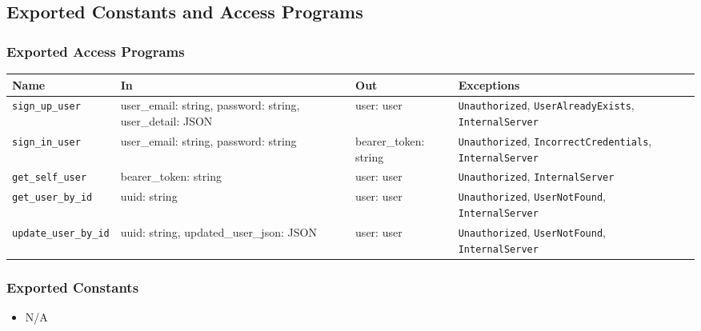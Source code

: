 \documentclass[12pt, titlepage]{article}
\begin{document}
\subsection{Exported Constants and Access Programs}
\subsubsection{Exported Access Programs}
\begin{center}
\small
\renewcommand{\arraystretch}{1.5}
\begin{tabular}{|p{3.5cm}|p{3.5cm}|p{2.5cm}|p{4cm}|}
    \hline
    \textbf{Name} & \textbf{In} & \textbf{Out} & \textbf{Exceptions} \\
    \hline 
    \texttt{sign\_up\_user} & user\_email: string, \newline password: string, \newline user\_detail: JSON & user: user & \texttt{Unauthorized}, \newline \texttt{UserAlreadyExists}, \newline \texttt{InternalServer} \\
    \hline
    \texttt{sign\_in\_user} & user\_email: string, \newline password: string & bearer\_token: string & \texttt{Unauthorized}, \newline \texttt{IncorrectCredentials}, \newline \texttt{InternalServer} \\
    \hline
    \texttt{get\_self\_user} & bearer\_token: string & user: user & \texttt{Unauthorized}, \newline \texttt{InternalServer} \\
    \hline
    \texttt{get\_user\_by\_id} & uuid: string & user: user & \texttt{Unauthorized}, \newline \texttt{UserNotFound}, \newline \texttt{InternalServer} \\
    \hline
    \texttt{update\_user\_by\_id} & uuid: string, \newline updated\_user\_json: JSON & user: user & \texttt{Unauthorized}, \newline \texttt{UserNotFound}, \newline \texttt{InternalServer} \\
    \hline
\end{tabular}
\end{center}

\subsubsection{Exported Constants}
\begin{itemize}
    \item N/A
\end{itemize}
\end{document}
